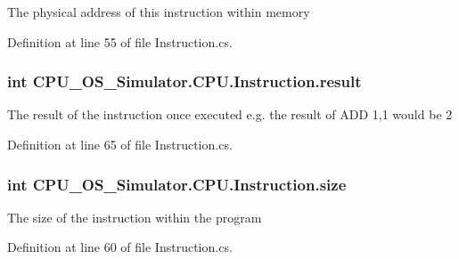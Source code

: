 The physical address of this instruction within memory 



Definition at line 55 of file Instruction.\+cs.

\hypertarget{class_c_p_u___o_s___simulator_1_1_c_p_u_1_1_instruction_a80637c7fae4090f9c73f468dbd6af7ee}{}
\subsubsection[{result}]{\setlength{\rightskip}{0pt plus 5cm}int C\+P\+U\+\_\+\+O\+S\+\_\+\+Simulator.\+C\+P\+U.\+Instruction.\+result\hspace{0.3cm}{\ttfamily [private]}}\label{class_c_p_u___o_s___simulator_1_1_c_p_u_1_1_instruction_a80637c7fae4090f9c73f468dbd6af7ee}


The result of the instruction once executed e.\+g. the result of A\+D\+D 1,1 would be 2 



Definition at line 65 of file Instruction.\+cs.

\hypertarget{class_c_p_u___o_s___simulator_1_1_c_p_u_1_1_instruction_a8c533b0c08d8ac0a85b0e342f95cfeec}{}
\subsubsection[{size}]{\setlength{\rightskip}{0pt plus 5cm}int C\+P\+U\+\_\+\+O\+S\+\_\+\+Simulator.\+C\+P\+U.\+Instruction.\+size\hspace{0.3cm}{\ttfamily [private]}}\label{class_c_p_u___o_s___simulator_1_1_c_p_u_1_1_instruction_a8c533b0c08d8ac0a85b0e342f95cfeec}


The size of the instruction within the program 



Definition at line 60 of file Instruction.\+cs.

\hypertarget{class_c_p_u___o_s___simulator_1_1_c_p_u_1_1_instruction_a0337c93fbfb5993eab37f1d052ca5f43}{}
